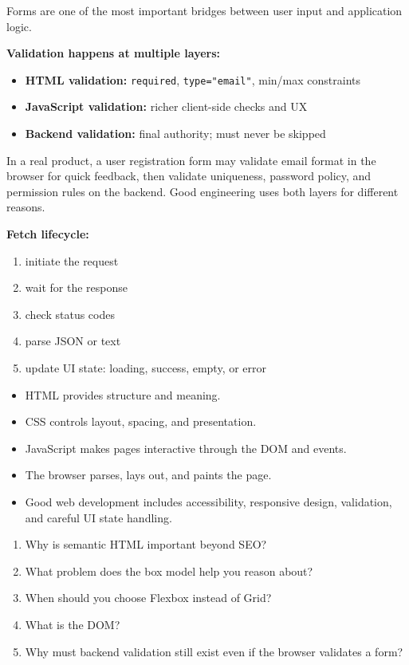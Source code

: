 \documentclass[12pt, a4paper, oneside]{book}
\begin{document}
Forms are one of the most important bridges between user input and application logic.

\textbf{Validation happens at multiple layers:}
\begin{itemize}[leftmargin=2em]
    \item \textbf{HTML validation:} \texttt{required}, \texttt{type="email"}, min/max constraints
    \item \textbf{JavaScript validation:} richer client-side checks and UX
    \item \textbf{Backend validation:} final authority; must never be skipped
\end{itemize}

\begin{projectbox}
In a real product, a user registration form may validate email format in the browser for quick feedback, then validate uniqueness, password policy, and permission rules on the backend. Good engineering uses both layers for different reasons.
\end{projectbox}

\textbf{Fetch lifecycle:}
\begin{enumerate}[leftmargin=2em]
    \item initiate the request
    \item wait for the response
    \item check status codes
    \item parse JSON or text
    \item update UI state: loading, success, empty, or error
\end{enumerate}

\begin{summarybox}
\begin{itemize}[leftmargin=2em]
    \item HTML provides structure and meaning.
    \item CSS controls layout, spacing, and presentation.
    \item JavaScript makes pages interactive through the DOM and events.
    \item The browser parses, lays out, and paints the page.
    \item Good web development includes accessibility, responsive design, validation, and careful UI state handling.
\end{itemize}
\end{summarybox}

\begin{recallbox}
\begin{enumerate}[leftmargin=2em]
    \item Why is semantic HTML important beyond SEO?
    \item What problem does the box model help you reason about?
    \item When should you choose Flexbox instead of Grid?
    \item What is the DOM?
    \item Why must backend validation still exist even if the browser validates a form?
\end{enumerate}
\end{recallbox}
\end{document}
